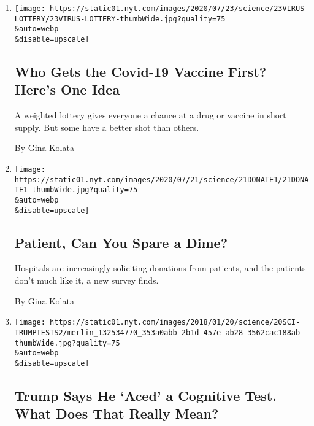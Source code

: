 \begin{enumerate}
\def\labelenumi{\arabic{enumi}.}
\item
  \href{/2020/07/23/health/coronavirus-vaccine-allocation.html}{}

  \texttt{[image: https://static01.nyt.com/images/2020/07/23/science/23VIRUS-LOTTERY/23VIRUS-LOTTERY-thumbWide.jpg?quality=75\\\&auto=webp\\\&disable=upscale]}

  \hypertarget{who-gets-the-covid-19-vaccine-first-heres-one-idea}{%
  \subsection{Who Gets the Covid-19 Vaccine First? Here's One
  Idea}\label{who-gets-the-covid-19-vaccine-first-heres-one-idea}}

  A weighted lottery gives everyone a chance at a drug or vaccine in
  short supply. But some have a better shot than others.

  By Gina Kolata
\item
  \href{/2020/07/21/health/hospitals-donations-patients.html}{}

  \texttt{[image: https://static01.nyt.com/images/2020/07/21/science/21DONATE1/21DONATE1-thumbWide.jpg?quality=75\\\&auto=webp\\\&disable=upscale]}

  \hypertarget{patient-can-you-spare-a-dime}{%
  \subsection{Patient, Can You Spare a
  Dime?}\label{patient-can-you-spare-a-dime}}

  Hospitals are increasingly soliciting donations from patients, and the
  patients don't much like it, a new survey finds.

  By Gina Kolata
\item
  \href{/article/trump-cognitive-test.html}{}

  \texttt{[image: https://static01.nyt.com/images/2018/01/20/science/20SCI-TRUMPTESTS2/merlin\_132534770\_353a0abb-2b1d-457e-ab28-3562cac188ab-thumbWide.jpg?quality=75\\\&auto=webp\\\&disable=upscale]}

  \hypertarget{trump-says-he-aced-a-cognitive-test-what-does-that-really-mean}{%
  \subsection{Trump Says He `Aced' a Cognitive Test. What Does That
  Really
  Mean?}\label{trump-says-he-aced-a-cognitive-test-what-does-that-really-mean}}


\end{enumerate}
